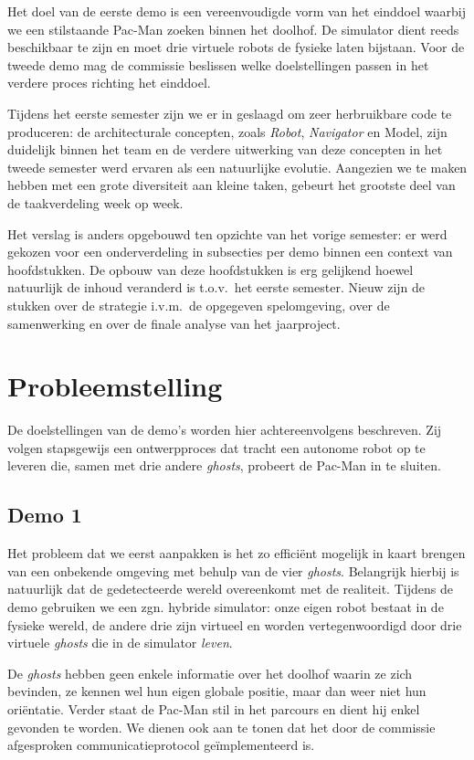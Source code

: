 \documentclass[12pt,a4paper]{report}
\begin{document}
Het doel van de eerste demo is een vereenvoudigde vorm van het einddoel waarbij we een stilstaande Pac-Man zoeken binnen het doolhof. De simulator dient  reeds beschikbaar te zijn en moet drie virtuele robots de fysieke laten bijstaan. Voor de tweede demo mag de commissie beslissen welke doelstellingen passen in het verdere proces richting het einddoel.

Tijdens het eerste semester zijn we er in geslaagd om zeer herbruikbare code te produceren: de architecturale concepten, zoals \emph{Robot}, \emph{Navigator} en Model, zijn duidelijk binnen het team en de verdere uitwerking van deze concepten in het tweede semester werd ervaren als een natuurlijke evolutie. Aangezien we te maken hebben met een grote diversiteit aan kleine taken, gebeurt het grootste deel van de taakverdeling week op week.

Het verslag is anders opgebouwd ten opzichte van het vorige semester: er werd gekozen voor een onderverdeling in subsecties per demo binnen een context van hoofdstukken. De opbouw van deze hoofdstukken is erg gelijkend hoewel natuurlijk de inhoud veranderd is t.o.v.\ het eerste semester. Nieuw zijn de stukken over de strategie i.v.m.\ de opgegeven spelomgeving, over de samenwerking en over de finale analyse van het jaarproject.

\chapter{Probleemstelling}

De doelstellingen van de demo's worden hier achtereenvolgens beschreven. Zij volgen stapsgewijs een ontwerpproces dat tracht een autonome robot op te leveren die, samen met drie andere \emph{ghosts}, probeert de Pac-Man in te sluiten.

\section{Demo 1}

Het probleem dat we eerst aanpakken is het zo effici\"ent mogelijk in kaart brengen van een onbekende omgeving met behulp van de vier \emph{ghosts}. Belangrijk hierbij is natuurlijk dat de gedetecteerde wereld overeenkomt met de realiteit. Tijdens de demo gebruiken we een zgn. hybride simulator: onze eigen robot bestaat in de fysieke wereld, de andere drie zijn virtueel en worden vertegenwoordigd door drie virtuele \emph{ghosts} die in de simulator \emph{leven}.

De \emph{ghosts} hebben geen enkele informatie over het doolhof waarin ze zich bevinden, ze kennen wel hun eigen globale positie, maar dan weer niet hun ori\"entatie. Verder staat de Pac-Man stil in het parcours en dient hij enkel gevonden te worden. We dienen ook aan te tonen dat het door de commissie afgesproken communicatieprotocol ge\"implementeerd is.
\end{document}
